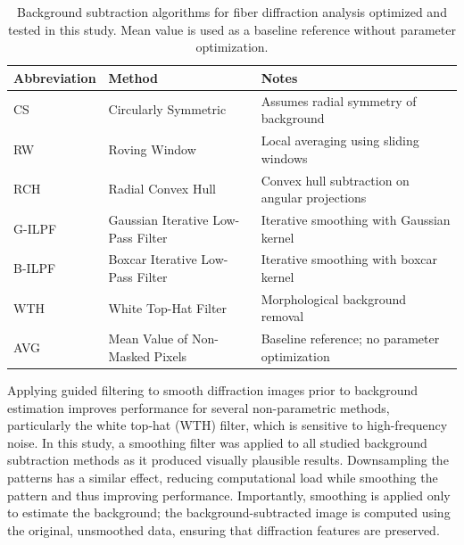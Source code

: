 \documentclass[iucr]{iucrjournals}
\begin{document}
\begin{table}[t]
\caption{Background subtraction algorithms for fiber diffraction analysis optimized and tested in this study. Mean value is used as a baseline reference without parameter optimization.}
\label{tab:algorithms}
\centering
\small
\setlength{\tabcolsep}{6pt}
\renewcommand{\arraystretch}{1.1}
\begin{tabular}{@{}lll@{}}
\toprule
\textbf{Abbreviation} & \textbf{Method} & \textbf{Notes} \\
\midrule
CS & Circularly Symmetric & Assumes radial symmetry of background \\
RW & Roving Window & Local averaging using sliding windows \\
RCH & Radial Convex Hull & Convex hull subtraction on angular projections \\
G-ILPF & Gaussian Iterative Low-Pass Filter & Iterative smoothing with Gaussian kernel \\
B-ILPF & Boxcar Iterative Low-Pass Filter & Iterative smoothing with boxcar kernel \\
WTH & White Top-Hat Filter & Morphological background removal \\
\midrule
AVG & Mean Value of Non-Masked Pixels & Baseline reference; no parameter optimization \\
\bottomrule
\end{tabular}
\end{table}


Applying guided filtering to smooth diffraction images prior to background estimation improves performance for several non-parametric methods, particularly the white top-hat (WTH) filter, which is sensitive to high-frequency noise. In this study, a smoothing filter was applied to all studied background subtraction methods as it produced visually plausible results. Downsampling the patterns has a similar effect, reducing computational load while smoothing the pattern and thus improving performance. Importantly, smoothing is applied only to estimate the background; the background-subtracted image is computed using the original, unsmoothed data, ensuring that diffraction features are preserved.
\end{document}
